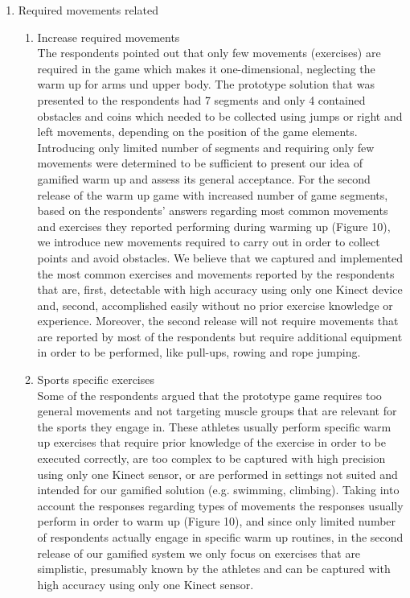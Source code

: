 \begin{enumerate}
\begin{enumerate}
\end{enumerate}
\item Required movements related
\begin{enumerate}
\item Increase required movements\\
The respondents pointed out that only few movements (exercises) are required in the game which makes it one-dimensional, neglecting the warm up for arms und upper body. The prototype solution that was presented to the respondents had 7 segments and only 4 contained obstacles and coins which needed to be collected using jumps or right and left movements, depending on the position of the game elements. Introducing only limited number of segments and requiring only few movements were determined to be sufficient to present our idea of gamified warm up and assess its general acceptance. For the second release of the warm up game with increased number of game segments, based on the respondents' answers regarding most common movements and exercises they reported performing during warming up (Figure 10), we introduce new movements required to carry out in order to collect points and avoid obstacles. We believe that we captured and implemented the most common exercises and movements reported by the respondents that are, first, detectable with high accuracy using only one Kinect device and, second, accomplished easily without no prior exercise knowledge or experience. Moreover, the second release will not require movements that are reported by most of the respondents but require additional equipment in order to be performed, like pull-ups, rowing and rope jumping.
\item Sports specific exercises\\
Some of the respondents argued that the prototype game requires too general movements and not targeting muscle groups that are relevant for the sports they engage in. These athletes usually perform specific warm up exercises that require prior knowledge of the exercise in order to be executed correctly, are too complex to be captured with high precision using only one Kinect sensor, or are performed in settings not suited and intended for our gamified solution (e.g. swimming, climbing).  Taking into account the responses regarding types of movements the responses usually perform in order to warm up (Figure 10), and since only limited number of respondents actually engage in specific warm up routines, in the second release of our gamified system we only focus on exercises that are simplistic, presumably known by the athletes and can be captured with high accuracy using only one Kinect sensor.

\end{enumerate}
\end{enumerate}
